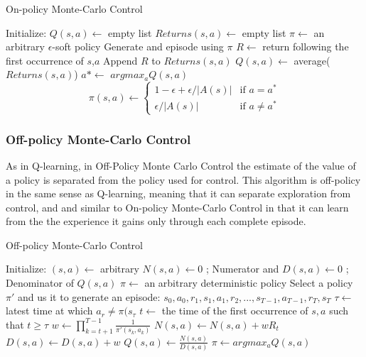 \documentclass[11pt]{article}
\begin{document}
\begin{algorithm}
\caption{On-policy Monte-Carlo Control}
\begin{algorithmic}[1]
\label{onpmc}
\STATE Initialize:
\STATE $Q(s,a) \leftarrow$ empty list
\STATE $Returns(s,a) \leftarrow$ empty list
\STATE $\pi \leftarrow$ an arbitrary $\epsilon$-soft policy
\LOOP
\STATE Generate and episode using $\pi$ 
\STATE $R \leftarrow$ return following the first occurrence of $s$,$a$
\STATE Append $R$ to $Returns(s,a)$
\STATE $Q(s,a) \leftarrow$ average($Returns(s,a)$)
\ENDFOR
{}
\STATE $a* \leftarrow$ $arg max_aQ(s,a)$
\STATE 
\begin{equation}
  \pi(s,a) \leftarrow 
  \begin{cases}
    1 - \epsilon + \epsilon/ \left|A(s)\right| & \text{if $a=a^*$}\\  
    \epsilon/ \left|A(s)\right| & \text{if $a \neq a^*$}
  \end{cases}
\end{equation}
\ENDFOR
\ENDFOR
\ENDLOOP
\ENDFOR
\end{algorithmic}
\end{algorithm}

\subsubsection{Off-policy Monte-Carlo Control}
As in Q-learning, in Off-Policy Monte Carlo Control the estimate of the value of a policy is separated from the policy used for control. This algorithm is off-policy in the same sense as Q-learning, meaning that it can separate exploration from control, and and similar to On-policy Monte-Carlo Control in that it can learn from the the experience it gains only through each complete episode.

\begin{algorithm}
\caption{Off-policy Monte-Carlo Control}
\begin{algorithmic}[1]
\label{offpmc}
\STATE Initialize:
\STATE $(s,a) \leftarrow$ arbitrary
\STATE $N(s,a) \leftarrow 0$ \hspace{20mm} ; Numerator and
\STATE $D(s,a) \leftarrow 0$ \hspace{20mm} ; Denominator of $Q(s,a)$
\STATE $\pi \leftarrow$ an arbitrary deterministic policy
\LOOP
\STATE Select a policy $\pi'$ and us it to generate an episode:
\STATE \hspace{20mm} $s_0,a_0,r_1,s_1,a_1,r_2,...,s_{T-1},a_{T-1},r_T,s_T$
\STATE $\tau \leftarrow $ latest time at which $a_r \neq \pi(s_{\tau}$
\STATE $t \leftarrow$ the time of the first occurrence of $s,a$ such that $t \ge \tau$
\STATE $w \leftarrow \prod_{k=t+1}^{T-1} \frac{1}{\pi'(s_k,a_k)}$
\STATE $N(s,a) \leftarrow N(s,a) + wR_t$
\STATE $D(s,a) \leftarrow D(s,a) + w$
\STATE $Q(s,a) \leftarrow \frac{N(s,a)}{D(s,a)}$
\ENDFOR
{}
\STATE $\pi \leftarrow argmax_aQ(s,a)$
\ENDFOR
\ENDLOOP
\ENDFOR
\end{algorithmic}
\end{algorithm}
\end{document}

